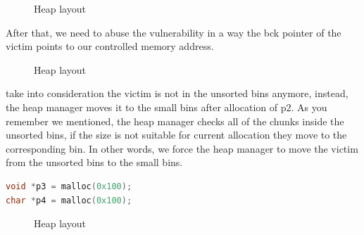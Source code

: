 \documentclass{masterthesis}
\newcommand*\ub{unsorted bins}
\newcommand*\sbs{small bins}
\begin{document}
 \begin{figure}[h!]
  \caption{Heap layout}
\end{figure}
After that, we need to abuse the vulnerability in a way the bck pointer of the victim points to our controlled memory address. 
 \begin{figure}[h!]
  \caption{Heap layout}
\end{figure}
take into consideration the victim is not in the \ub{} anymore, instead, the heap manager moves it to the \sbs{} after allocation of p2. As you remember we mentioned, the heap manager checks all of the chunks inside the \ub{}, if the size is not suitable for current allocation they move to the corresponding bin. In other words, we force the heap manager to move the victim from the \ub{} to the \sbs{}.

\begin{lstlisting}[language=c,frame=tlrb]
void *p3 = malloc(0x100);
char *p4 = malloc(0x100);
\end{lstlisting}

\begin{figure}[h!]
  \caption{Heap layout}
\end{figure}
\end{document}
